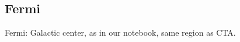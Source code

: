 \subsection{Fermi}
\label{sec:apps:fermi}

Fermi: Galactic center, as in our notebook, same region as CTA.
